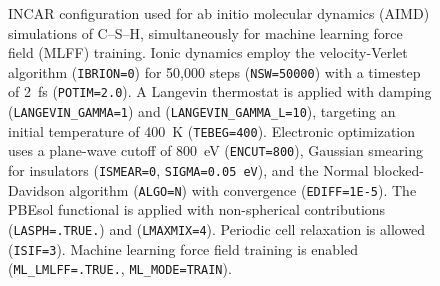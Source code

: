 \begin{figure}[H]
    \centering
    \begin{threeparttable}
        \caption{INCAR configuration used for ab initio molecular dynamics (AIMD) simulations of C--S--H, simultaneously for machine learning force field (MLFF) training. Ionic dynamics employ the velocity-Verlet algorithm (\texttt{IBRION=0}) for 50,000 steps (\texttt{NSW=50000}) with a timestep of 2~fs (\texttt{POTIM=2.0}). A Langevin thermostat is applied with damping (\texttt{LANGEVIN\_GAMMA=1}) and (\texttt{LANGEVIN\_GAMMA\_L=10}), targeting an initial temperature of 400~K (\texttt{TEBEG=400}). Electronic optimization uses a plane-wave cutoff of 800~eV (\texttt{ENCUT=800}), Gaussian smearing for insulators (\texttt{ISMEAR=0}, \texttt{SIGMA=0.05~eV}), and the Normal blocked-Davidson algorithm (\texttt{ALGO=N}) with convergence (\texttt{EDIFF=1E-5}). The PBEsol functional is applied with non-spherical contributions (\texttt{LASPH=.TRUE.}) and (\texttt{LMAXMIX=4}). Periodic cell relaxation is allowed (\texttt{ISIF=3}). Machine learning force field training is enabled (\texttt{ML\_LMLFF=.TRUE.}, \texttt{ML\_MODE=TRAIN}).}
        \label{fig:incar_md}
\end{threeparttable}
\end{figure}
